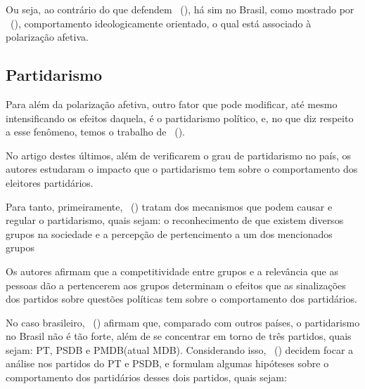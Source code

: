 \documentclass[
	12pt,				%
	openright,			%
	twoside,			%
	a4paper,			%
	openany,
	english,			%
	brazil				%
	]{abntex2}
\begin{document}
Ou seja, ao contrário do que defendem ~(\citeyear{Oliveira2015Sep}), há sim no Brasil, como mostrado por ~(\citeyear{fuks2020afeto}), comportamento ideologicamente orientado, o qual está associado à polarização afetiva.

\subsection{Partidarismo}


Para além da polarização afetiva, outro fator que pode modificar, até mesmo intensificando os efeitos daquela, é o partidarismo político, e, no que diz respeito a esse fenômeno, temos o trabalho de ~(\citeyear{Samuels2014Jan}).

No artigo destes últimos\cite{Samuels2014Jan}, além de verificarem o grau de partidarismo no país, os autores estudaram o impacto que o partidarismo tem sobre o comportamento dos eleitores partidários.

Para tanto, primeiramente, ~(\citeyear{Samuels2014Jan}) tratam dos mecanismos que podem causar e regular o partidarismo, quais sejam: o reconhecimento de que existem diversos grupos na sociedade e a percepção de pertencimento a um dos mencionados grupos

 Os autores\cite{Samuels2014Jan} afirmam que a competitividade entre grupos e a relevância que as pessoas dão a pertencerem aos grupos determinam o efeitos que as sinalizações dos partidos sobre questões políticas tem sobre o comportamento dos partidários.

No caso brasileiro, ~(\citeyear{Samuels2014Jan}) afirmam que, comparado com outros países, o partidarismo no Brasil não é tão forte, além de se concentrar em torno de três partidos, quais sejam: PT, PSDB e PMDB(atual MDB). Considerando isso, ~(\citeyear{Samuels2014Jan}) decidem focar a análise nos partidos do PT e PSDB, e formulam algumas hipóteses sobre o comportamento dos partidários desses dois partidos, quais sejam:
\end{document}
